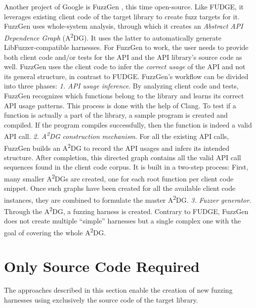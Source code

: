 \documentclass[
  a4paper,
]{scrreprt}
\theoremstyle{definition}
\theoremstyle{remark}
\begin{document}
Another project of Google is FuzzGen \autocite{fuzzgen}, this time
open-source. Like FUDGE, it leverages existing client code of the target
library to create fuzz targets for it. FuzzGen uses whole-system
analysis, through which it creates an \emph{Abstract API Dependence
Graph} (A\textsuperscript{2}DG). It uses the latter to automatically
generate LibFuzzer-compatible harnesses. For FuzzGen to work, the user
needs to provide both client code and/or tests for the API and the API
library's source code as well. FuzzGen uses the client code to infer the
\emph{correct usage} of the API and not its general structure, in
contrast to FUDGE. FuzzGen's workflow can be divided into three phases:
\emph{1. API usage inference}. By analyzing client code and tests,
FuzzGen recognizes which functions belong to the library and learns its
correct API usage patterns. This process is done with the help of Clang.
To test if a function is actually a part of the library, a sample
program is created and compiled. If the program compiles successfully,
then the function is indeed a valid API call. \emph{2.
A\textsuperscript{2}DG construction mechanism}. For all the existing API
calls, FuzzGen builds an A\textsuperscript{2}DG to record the API usages
and infers its intended structure. After completion, this directed graph
contains all the valid API call sequences found in the client code
corpus. It is built in a two-step process: First, many smaller
A\textsuperscript{2}DGs are created, one for each root function per
client code snippet. Once such graphs have been created for all the
available client code instances, they are combined to formulate the
master A\textsuperscript{2}DG. \emph{3. Fuzzer generator}. Through the
A\textsuperscript{2}DG, a fuzzing harness is created. Contrary to FUDGE,
FuzzGen does not create multiple ``simple'' harnesses but a single
complex one with the goal of covering the whole A\textsuperscript{2}DG.

\section{Only Source Code Required}\label{only-source-code-required}

The approaches described in this section enable the creation of new
fuzzing harnesses using exclusively the source code of the target
library.
\end{document}
